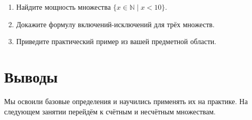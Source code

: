 \documentclass[11pt,a4paper]{article}
\begin{document}
\begin{enumerate}
  \item Найдите мощность множества $\{x \in \mathbb{N} \mid x < 10\}$.
  \item Докажите формулу включений-исключений для трёх множеств.
  \item Приведите практический пример из вашей предметной области.
\end{enumerate}

\section{Выводы}

\begin{keyidea}
Мы освоили базовые определения и научились применять их на практике.
На следующем занятии перейдём к счётным и несчётным множествам.
\end{keyidea}
\end{document}
